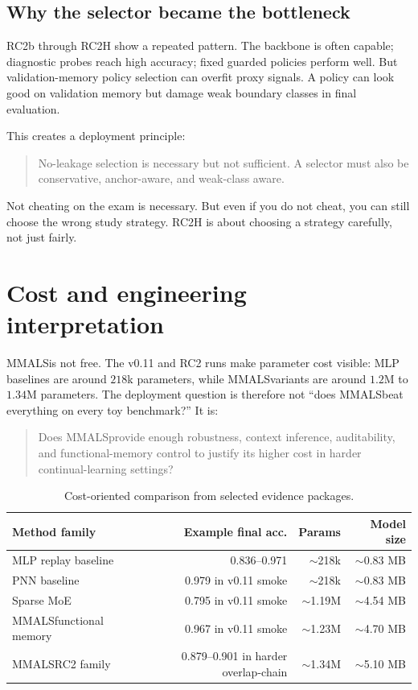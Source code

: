 \documentclass[11pt]{article}
\newcommand{\mmals}{\textsc{MMALS}}
\begin{document}
\subsection{Why the selector became the bottleneck}

RC2b through RC2H show a repeated pattern. The backbone is often capable; diagnostic probes reach high accuracy; fixed guarded policies perform well. But validation-memory policy selection can overfit proxy signals. A policy can look good on validation memory but damage weak boundary classes in final evaluation.

This creates a deployment principle:
\begin{quote}
No-leakage selection is necessary but not sufficient. A selector must also be conservative, anchor-aware, and weak-class aware.
\end{quote}

\begin{kidbox}
Not cheating on the exam is necessary. But even if you do not cheat, you can still choose the wrong study strategy. RC2H is about choosing a strategy carefully, not just fairly.
\end{kidbox}

\section{Cost and engineering interpretation}

\mmals is not free. The v0.11 and RC2 runs make parameter cost visible: MLP baselines are around $218$k parameters, while \mmals variants are around $1.2$M to $1.34$M parameters. The deployment question is therefore not ``does \mmals beat everything on every toy benchmark?'' It is:
\begin{quote}
Does \mmals provide enough robustness, context inference, auditability, and functional-memory control to justify its higher cost in harder continual-learning settings?
\end{quote}

\begin{table}[h]
\centering
\caption{Cost-oriented comparison from selected evidence packages.}
\begin{tabular}{lrrr}
\toprule
Method family & Example final acc. & Params & Model size \\
\midrule
MLP replay baseline & 0.836--0.971 & $\sim$218k & $\sim$0.83 MB \\
PNN baseline & 0.979 in v0.11 smoke & $\sim$218k & $\sim$0.83 MB \\
Sparse MoE & 0.795 in v0.11 smoke & $\sim$1.19M & $\sim$4.54 MB \\
\mmals functional memory & 0.967 in v0.11 smoke & $\sim$1.23M & $\sim$4.70 MB \\
\mmals RC2 family & 0.879--0.901 in harder overlap-chain & $\sim$1.34M & $\sim$5.10 MB \\
\bottomrule
\end{tabular}
\end{table}
\end{document}
